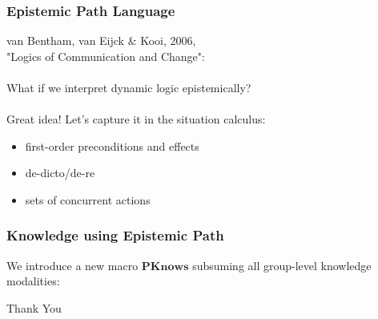 \documentclass[compress]{beamer}
\newcommand{\EKnows}{\mathbf{EKnows}}
\newcommand{\Knows}{\mathbf{Knows}}
\newcommand{\CKnows}{\mathbf{CKnows}}
\newcommand{\PKnows}{\mathbf{PKnows}}
\begin{document}
\begin{frame}
\frametitle{Epistemic Path Language}
van Bentham, van Eijck \& Kooi, 2006,\\
"Logics of Communication and Change":
\ \\
\ \\
What if we interpret dynamic logic epistemically?
\ \\
\ \\
\pause
Great idea!  Let's capture it in the situation calculus:
\begin{itemize}
\item first-order preconditions and effects
\item de-dicto/de-re
\item sets of concurrent actions
\end{itemize}
\end{frame}

\begin{frame}
\frametitle{Knowledge using Epistemic Path}
We introduce a new macro $\PKnows$ subsuming all group-level knowledge modalities:
\end{frame}


\begin{frame}
\centering \large Thank You\\
\end{frame}
\end{document}
